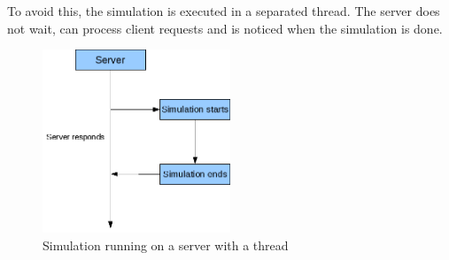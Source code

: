 To avoid this, the simulation is executed in a separated thread. The server
does not wait, can process client requests and is noticed when the simulation
is done.\\

\begin{figure}[H]
 \begin{center}
  \includegraphics[width=0.5\textwidth]{images/serverWithThread}
 \end{center}
\caption{Simulation running on a server with a thread}
\end{figure}

